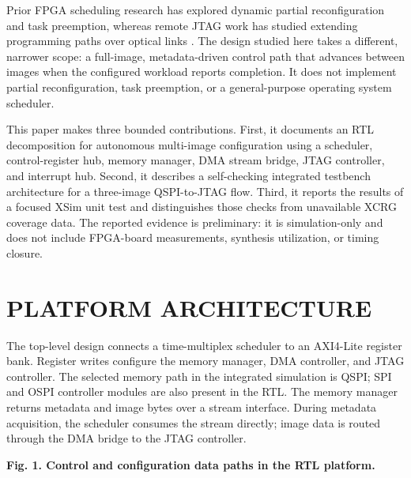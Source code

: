 \documentclass[conference]{IEEEtran}
\begin{document}
Prior FPGA scheduling research has explored dynamic partial reconfiguration and task preemption, whereas remote JTAG work has studied extending programming paths over optical links \cite{4,5}. The design studied here takes a different, narrower scope: a full-image, metadata-driven control path that advances between images when the configured workload reports completion. It does not implement partial reconfiguration, task preemption, or a general-purpose operating system scheduler.

This paper makes three bounded contributions. First, it documents an RTL decomposition for autonomous multi-image configuration using a scheduler, control-register hub, memory manager, DMA stream bridge, JTAG controller, and interrupt hub. Second, it describes a self-checking integrated testbench architecture for a three-image QSPI-to-JTAG flow. Third, it reports the results of a focused XSim unit test and distinguishes those checks from unavailable XCRG coverage data. The reported evidence is preliminary: it is simulation-only and does not include FPGA-board measurements, synthesis utilization, or timing closure.

\section{PLATFORM ARCHITECTURE}

The top-level design connects a time-multiplex scheduler to an AXI4-Lite register bank. Register writes configure the memory manager, DMA controller, and JTAG controller. The selected memory path in the integrated simulation is QSPI; SPI and OSPI controller modules are also present in the RTL. The memory manager returns metadata and image bytes over a stream interface. During metadata acquisition, the scheduler consumes the stream directly; image data is routed through the DMA bridge to the JTAG controller.

\noindent\textbf{\footnotesize Fig. 1. Control and configuration data paths in the RTL platform.}\par\vspace{1pt}

\begin{center}\end{center}
\end{document}
